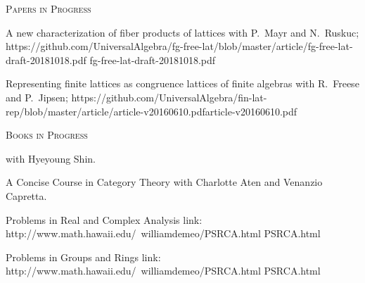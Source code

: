 


    \noindent \textsc{Papers in Progress}

\begin{itemize}
\pubitem
{A new characterization of fiber products of lattices}
{with P.~Mayr and N.~Ruskuc;}
{}
{}
{https://github.com/UniversalAlgebra/fg-free-lat/blob/master/article/fg-free-lat-draft-20181018.pdf}
{fg-free-lat-draft-20181018.pdf}
           
\pubitem
{Representing finite lattices as congruence lattices of finite algebras}
{with R.~Freese and P.~Jipsen;}
{}
{}
{https://github.com/UniversalAlgebra/fin-lat-rep/blob/master/article/article-v20160610.pdf}{article-v20160610.pdf}
\end{itemize}

\noindent \textsc{Books in Progress}
\begin{itemize}
{with Hyeyoung Shin.}
{}
{}

\bookitem
{A Concise Course in Category Theory}
{with Charlotte Aten and Venanzio Capretta.}
{}
{}

\bookitem 
{Problems in Real and Complex Analysis}
{link: }
{http://www.math.hawaii.edu/~williamdemeo/PSRCA.html}
{PSRCA.html}

\bookitem 
{Problems in Groups and Rings}
{link: }
{http://www.math.hawaii.edu/~williamdemeo/PSRCA.html}
{PSRCA.html}

\end{itemize}

